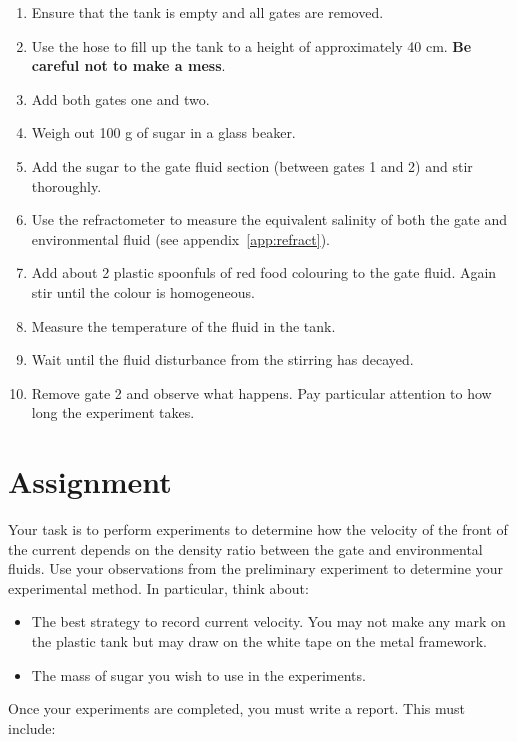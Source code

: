 \documentclass[]{article}
\theoremstyle{definition}
\begin{document}
\begin{enumerate}
\item Ensure that the tank is empty and all gates are removed.
\item Use the hose to fill up the tank to a height of approximately 40 cm. \textbf{Be careful not to make a mess}.
\item Add both gates one and two.
\item Weigh out 100 g of sugar in a glass beaker.
\item Add the sugar to the gate fluid section (between gates 1 and 2) and stir thoroughly.
\item Use the refractometer to measure the equivalent salinity of both the gate and environmental fluid (see appendix~\ref{app:refract}).
\item Add about 2 plastic spoonfuls of red food colouring to the gate fluid. Again stir until the colour is homogeneous.
\item Measure the temperature of the fluid in the tank.
\item Wait until the fluid disturbance from the stirring has decayed.
\item Remove gate 2 and observe what happens. Pay particular attention to how long the experiment takes.
\end{enumerate}

\section{Assignment}
\label{sec:assign}

Your task is to perform experiments to determine how the velocity of the front of the current depends on the density ratio between the gate and environmental fluids. Use your observations from the preliminary experiment to determine your experimental method. In particular, think about:

\begin{itemize}
\item The best strategy to record current velocity. You may not make any mark on the plastic tank but may draw on the white tape on the metal framework.
\item The mass of sugar you wish to use in the experiments.
\end{itemize}

Once your experiments are completed, you must write a report. This must include:
\end{document}
